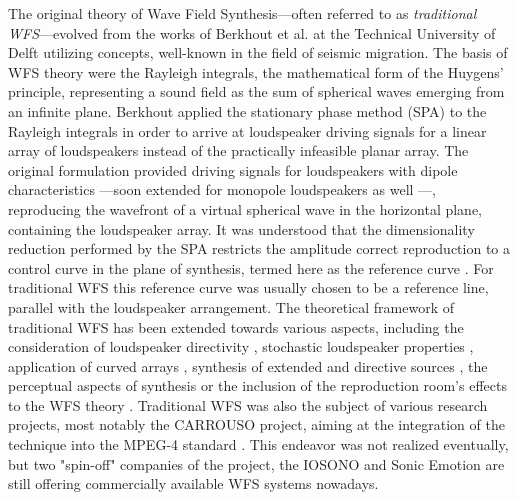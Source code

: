 The original theory of Wave Field Synthesis---often referred to as \emph{traditional WFS}---evolved from the works of Berkhout et al. at the Technical University of Delft utilizing concepts, well-known in the field of seismic migration.%
The basis of WFS theory were the Rayleigh integrals, the mathematical form of the Huygens' principle, representing a sound field as the sum of spherical waves emerging from an infinite plane.
Berkhout applied the stationary phase method (SPA) to the Rayleigh integrals in order to arrive at loudspeaker driving signals for a linear array of loudspeakers instead of the practically infeasible planar array.
The original formulation provided driving signals for loudspeakers with dipole characteristics \cite{Berkhout1988, Berkhout1993:Acoustic_control_by_WFS}---soon extended for monopole loudspeakers as well \cite{doi:10.1121/1.404755, Vogel1993:phd, devries1994the, Start1997:phd, Verheijen1997:phd, deBrujin2004}---, reproducing the wavefront of a virtual spherical wave in the horizontal plane, containing the loudspeaker array.
It was understood that the dimensionality reduction performed by the SPA restricts the amplitude correct reproduction to a control curve in the plane of synthesis, termed here as the reference curve \cite{sonke1998variable}.
For traditional WFS this reference curve was usually chosen to be a reference line, parallel with the loudspeaker arrangement.
The theoretical framework of traditional WFS has been extended towards various aspects, including the consideration of loudspeaker directivity \cite{devries1996sound, Firtha2012:isma}, stochastic loudspeaker properties \cite{Firtha2013:daga, Firtha2013:internoise}, application of curved arrays \cite{start1996application}, synthesis of extended and directive sources \cite{Corteel2007, Baalman2008:phd}, the perceptual aspects of synthesis \cite{Wittek2007:phd, Corteel2006:phd, Hulsebos2004:phd, wittek2004spatial, strauss2004generation} or the inclusion of the reproduction room's effects to the WFS theory \cite{spors2003an, corteel2003listening, 1326755, buchner2004efficient, petrausch2005simulation}.
Traditional WFS was also the subject of various research projects, most notably the CARROUSO project, aiming at the integration of the technique into the MPEG-4 standard \cite{sporer2001carrouso}. 
This endeavor was not realized eventually, but two "spin-off" companies of the project, the IOSONO and Sonic Emotion are still offering commercially available WFS systems nowadays.

